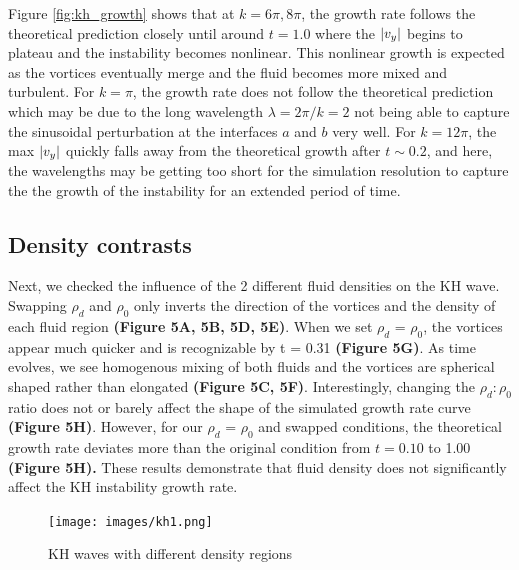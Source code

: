 \documentclass{article}
\begin{document}
Figure \ref{fig:kh_growth} shows that at $k =  6\pi, 8\pi$, the growth rate follows the theoretical prediction closely 
until around $t = 1.0$ where the $\abs{v_y}$ begins to plateau and the instability becomes nonlinear.
This nonlinear growth is expected as the vortices eventually merge and the fluid becomes more mixed and turbulent.
For $k = \pi$, the growth rate does not follow the theoretical prediction which may be due to the long wavelength $\lambda = 2\pi / k = 2$
not being able to capture the sinusoidal perturbation at the interfaces $a$ and $b$ very well.
For $k = 12\pi$, the max $\abs{v_y}$ quickly falls away from the theoretical growth after $t \sim 0.2$, and 
here, the wavelengths may be getting too short for the simulation resolution to capture the the growth
of the instability for an extended period of time.

\newpage
\subsection*{Density contrasts}

Next, we checked the influence of the 2 different fluid densities on the
KH wave. Swapping \(\rho_{d}\) and \(\rho_{0}\) only inverts the
direction of the vortices and the density of each fluid region
\textbf{(Figure 5A, 5B, 5D, 5E)}. When we set \(\rho_{d}\) =
\(\rho_{0}\), the vortices appear much quicker and is recognizable by t
= 0.31 \textbf{(Figure 5G)}. As time evolves, we see homogenous mixing
of both fluids and the vortices are spherical shaped rather than
elongated \textbf{(Figure 5C, 5F)}. Interestingly, changing the
\(\rho_d:\rho_0\) ratio does not or barely affect the shape of the
simulated growth rate curve \textbf{(Figure 5H)}. However, for our
\(\rho_{d}\) = \(\rho_{0}\) and swapped conditions, the theoretical
growth rate deviates more than the original condition from $t = 0.10$ to
1.00 \textbf{(Figure 5H).} These results demonstrate that fluid density
does not significantly affect the KH instability growth rate.



\begin{figure}[htbp]
    \centering
    \texttt{[image: images/kh1.png]}
    \caption{KH waves with different density regions}
    \label{fig:kh1}
\end{figure}
\end{document}

